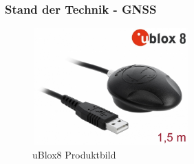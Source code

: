 \documentclass{beamer}
\begin{document}
\begin{frame}
\frametitle{Stand der Technik - GNSS}
	\begin{figure}[h!]
  		\caption{uBlox8 Produktbild}
		\includegraphics[width = 230px, height = 170px]{uBlox8.jpg}	
	\end{figure}
\end{frame}
\end{document}
